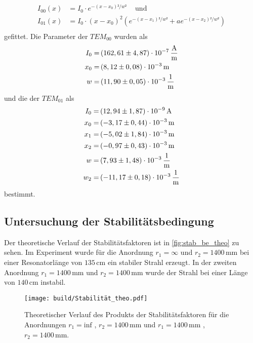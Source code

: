 \begin{align*}
    I_{00}(x) &= I_0 \cdot e^{-(x-x_0)²/w ²} \, \quad \text{und} \\
    I_{01}(x) &= I_0 \cdot (x-x_{0})^2 \left( e^{-(x-x_1)²/w ²} + a e^{-(x-x_2)²/w ²} \right) \\
\end{align*}
gefittet.
Die Parameter der $TEM_{00}$  wurden als 
\begin{align*}
   I_0 =& \left( 162,61 \pm 4,87 \right) \cdot 10^{-7} \, \dfrac{\unit{\ampere}}{\unit{\meter}} \\
   x_0 =& \left( 8,12   \pm 0,08 \right) \cdot 10^{-3} \, \unit{\meter}                         \\
   w   =& \left(11,90   \pm 0,05 \right) \cdot 10^{-3} \, \unit{\dfrac{1}{\meter}}              \\
\end{align*}
und die der $TEM_{01}$ als
\begin{align*}
    I_0 =& \left( 12,94  \pm 1,87 \right) \cdot 10^{-9} \, \unit{\ampere}           \\
    x_0 =& \left( -3,17  \pm 0,44 \right) \cdot 10^{-3} \, \unit{\meter}            \\
    x_1 =& \left( -5,02  \pm 1,84 \right) \cdot 10^{-3} \, \unit{\meter}            \\
    x_2 =& \left( -0,97  \pm 0,43 \right) \cdot 10^{-3} \, \unit{\meter}            \\
    w   =& \left(  7,93  \pm 1,48 \right) \cdot 10^{-3} \, \unit{\dfrac{1}{\meter}} \\
    w_2 =& \left(-11,17  \pm 0,18 \right) \cdot 10^{-3} \, \unit{\dfrac{1}{\meter}} \\
 \end{align*}
 bestimmt.

\subsection{Untersuchung der Stabilitätsbedingung}
\label{sec:Stab_be}
Der theoretische Verlauf der Stabilitätsfaktoren ist in \autoref{fig:stab_be_theo} zu sehen.
Im Experiment wurde für die Anordnung $r_1 = \infty$ und $r_2 = 1400 \, \unit{\milli\meter}$ bei einer Resonatorlänge von $135 \, \unit{\centi\meter}$ ein stabiler Strahl erzeugt.
In der zweiten Anordnung $r_1 = 1400 \, \unit{\milli\meter}$ und $r_2 = 1400 \, \unit{\milli\meter}$ wurde der Strahl bei einer Länge von $140 \, \unit{\centi\meter}$ instabil.
 \begin{figure}[H]
    \centering
    \texttt{[image: build/Stabilität\_theo.pdf]}
    \caption{Theoretischer Verlauf des Produkts der Stabilitätsfaktoren für die Anordnungen $r_1 = \text{inf}$ , $r_2 = 1400 \, \unit{\milli\meter}$ und $r_1 = 1400 \, \unit{\milli\meter}$ , $r_2 = 1400 \, \unit{\milli\meter}$.}
    \label{fig:stab_be_theo}
\end{figure}

